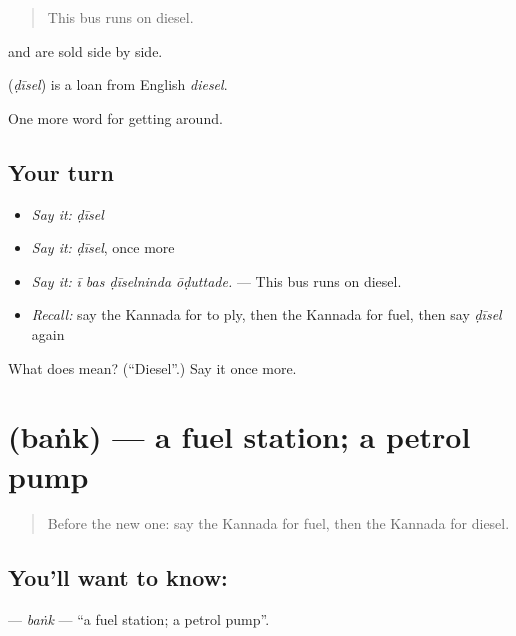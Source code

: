 \begin{quote}
This bus runs on diesel.
\end{quote}

 and  are sold side by side.

\begin{cousinweb}
\textbf{} (\emph{ḍīsel}) is a loan from English \emph{diesel}.
\end{cousinweb}

\begin{grammarlens}[title={What you've built}]
One more word for getting around.
\end{grammarlens}

\subsection*{Your turn}
\begin{itemize}
\raggedright
  \item \emph{Say it:} \emph{ḍīsel}
  \item \emph{Say it:} \emph{ḍīsel}, once more
  \item \emph{Say it:} \emph{ī bas ḍīselninda ōḍuttade.} — This bus runs on diesel.
  \item \emph{Recall:} say the Kannada for to ply, then the Kannada for fuel, then say \emph{ḍīsel} again
\end{itemize}

\begin{tcolorbox}[breakable,colback=teal!4,colframe=teal!35!black,title={Before you move on}]
What does  mean? (\textquotedblleft{}Diesel\textquotedblright{}.) Say it once more.
\end{tcolorbox}
\section[\texorpdfstring{\kn{ಬಂಕ್} (baṅk)}{ಬಂಕ್ (baṅk)}]{ (baṅk) — a fuel station; a petrol pump}

\label{lesson:KA-C448-bank}



\begin{quote}
Before the new one: say the Kannada for fuel, then the Kannada for diesel.
\end{quote}

\subsection*{You'll want to know: }
\textbf{} — \emph{baṅk} — \textquotedblleft{}a fuel station; a petrol pump\textquotedblright{}.

